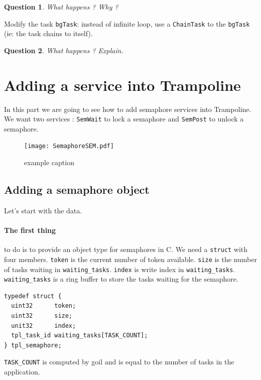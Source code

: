 \documentclass[11pt]{article}
\newtheorem{ex}{Question}
\begin{document}
\begin{ex}
What happens ? Why ?
\end{ex}

Modify the task \texttt{bgTask}: instead of infinite loop, use a \texttt{ChainTask} to the \texttt{bgTask} (ie: the task chains to itself).

\begin{ex}
What happens ? Explain.
\end{ex}

\section{Adding a service into Trampoline}

In this part we are going to see how to add semaphore services into Trampoline. We want two services : \lstinline{SemWait} to lock a semaphore and \lstinline{SemPost} to unlock a semaphore.

\begin{figure}[htbp] %
   \centering
   \texttt{[image: SemaphoreSEM.pdf]} 
   \caption{example caption}
   \label{fig:example}
\end{figure}

\subsection{Adding a semaphore object}

Let's start with the data. 

\paragraph{The first thing} to do is to provide an object type for semaphores in C. We need a \lstinline{struct} with four members. \lstinline{token} is the current number of token available. \lstinline{size} is the number of tasks waiting in \lstinline{waiting_tasks}. \lstinline{index} is write index in \lstinline{waiting_tasks}. \lstinline{waiting_tasks} is a ring buffer to store the tasks waiting for the semaphore.

\begin{lstlisting}
typedef struct {
  uint32      token;
  uint32      size;
  unit32      index;
  tpl_task_id waiting_tasks[TASK_COUNT];
} tpl_semaphore;
\end{lstlisting}

\lstinline{TASK_COUNT} is computed by goil and is equal to the number of tasks in the application. 
\end{document}
